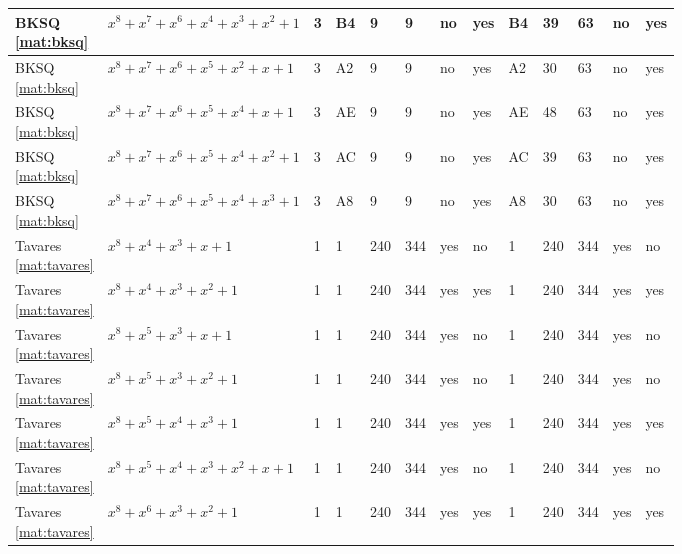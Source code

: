 \begin{tiny}
\begin{longtable}{|l|l|l|l|l|l|l|l|l|l|l|l|l|}
\shortstack{BKSQ \\ \eqref{mat:bksq}} & $x^8 + x^7 + x^6 + x^4 + x^3 + x^2 + 1$ & 3 & B4 & 9 & 9 & no & yes & B4 & 39 & 63 & no & yes \\ \hline
\shortstack{BKSQ \\ \eqref{mat:bksq}} & $x^8 + x^7 + x^6 + x^5 + x^2 + x + 1$ & 3 & A2 & 9 & 9 & no & yes & A2 & 30 & 63 & no & yes \\ \hline
\shortstack{BKSQ \\ \eqref{mat:bksq}} & $x^8 + x^7 + x^6 + x^5 + x^4 + x + 1$ & 3 & AE & 9 & 9 & no & yes & AE & 48 & 63 & no & yes \\ \hline
\shortstack{BKSQ \\ \eqref{mat:bksq}} & $x^8 + x^7 + x^6 + x^5 + x^4 + x^2 + 1$ & 3 & AC & 9 & 9 & no & yes & AC & 39 & 63 & no & yes \\ \hline
\shortstack{BKSQ \\ \eqref{mat:bksq}} & $x^8 + x^7 + x^6 + x^5 + x^4 + x^3 + 1$ & 3 & A8 & 9 & 9 & no & yes & A8 & 30 & 63 & no & yes \\ \hline
\shortstack{Tavares \\ \eqref{mat:tavares}} & $x^8 + x^4 + x^3 + x + 1$ & 1 & 1 & 240 & 344 & yes & no & 1 & 240 & 344 & yes & no \\ \hline
\shortstack{Tavares \\ \eqref{mat:tavares}} & $x^8 + x^4 + x^3 + x^2 + 1$ & 1 & 1 & 240 & 344 & yes & yes & 1 & 240 & 344 & yes & yes \\ \hline
\shortstack{Tavares \\ \eqref{mat:tavares}} & $x^8 + x^5 + x^3 + x + 1$ & 1 & 1 & 240 & 344 & yes & no & 1 & 240 & 344 & yes & no \\ \hline
\shortstack{Tavares \\ \eqref{mat:tavares}} & $x^8 + x^5 + x^3 + x^2 + 1$ & 1 & 1 & 240 & 344 & yes & no & 1 & 240 & 344 & yes & no \\ \hline
\shortstack{Tavares \\ \eqref{mat:tavares}} & $x^8 + x^5 + x^4 + x^3 + 1$ & 1 & 1 & 240 & 344 & yes & yes & 1 & 240 & 344 & yes & yes \\ \hline
\shortstack{Tavares \\ \eqref{mat:tavares}} & $x^8 + x^5 + x^4 + x^3 + x^2 + x + 1$ & 1 & 1 & 240 & 344 & yes & no & 1 & 240 & 344 & yes & no \\ \hline
\shortstack{Tavares \\ \eqref{mat:tavares}} & $x^8 + x^6 + x^3 + x^2 + 1$ & 1 & 1 & 240 & 344 & yes & yes & 1 & 240 & 344 & yes & yes \\ \hline

\end{longtable}
\end{tiny}
